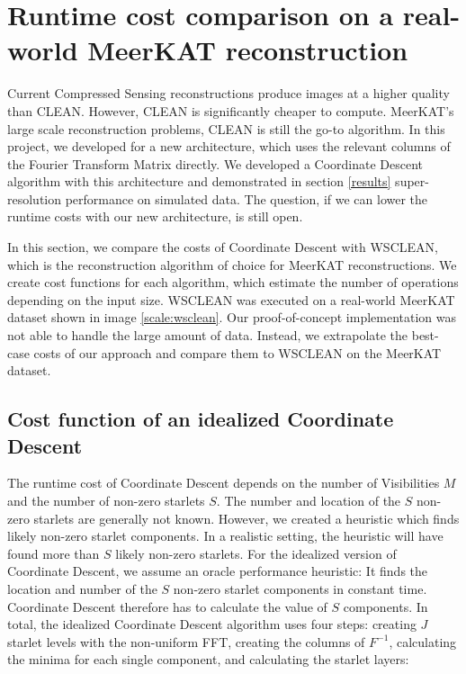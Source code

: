 \section{Runtime cost comparison on a real-world MeerKAT reconstruction}
Current Compressed Sensing reconstructions produce images at a higher quality than CLEAN. However, CLEAN is significantly cheaper to compute. MeerKAT's large scale reconstruction problems, CLEAN is still the go-to algorithm. In this project, we developed for a new architecture, which uses the relevant columns of the Fourier Transform Matrix directly. We developed a Coordinate Descent algorithm with this architecture and demonstrated in section \ref{results} super-resolution performance on simulated data. The question, if we can lower the runtime costs with our new architecture, is still open. 

In this section, we compare the costs of Coordinate Descent with WSCLEAN, which is the reconstruction algorithm of choice for MeerKAT reconstructions. We create cost functions for each algorithm, which estimate the number of operations depending on the input size. WSCLEAN was executed on a real-world MeerKAT dataset shown in image \ref{scale:wsclean}. Our proof-of-concept implementation was not able to handle the large amount of data. Instead, we extrapolate the best-case costs of our approach and compare them to WSCLEAN on the MeerKAT dataset.


\subsection{Cost function of an idealized Coordinate Descent}
The runtime cost of Coordinate Descent depends on the number of Visibilities $M$ and the number of non-zero starlets $S$. The number and location of the $S$ non-zero starlets are generally not known. However, we created a heuristic which finds likely non-zero starlet components. In a realistic setting, the heuristic will have found more than $S$ likely non-zero starlets. For the idealized version of Coordinate Descent, we assume an oracle performance heuristic: It finds the location and number of the $S$ non-zero starlet components in constant time. Coordinate Descent therefore has to calculate the value of $S$  components. In total, the idealized Coordinate Descent algorithm uses four steps: creating $J$ starlet levels with the non-uniform FFT, creating the columns of $F^{-1}$, calculating the minima for each single component, and calculating the starlet layers:

